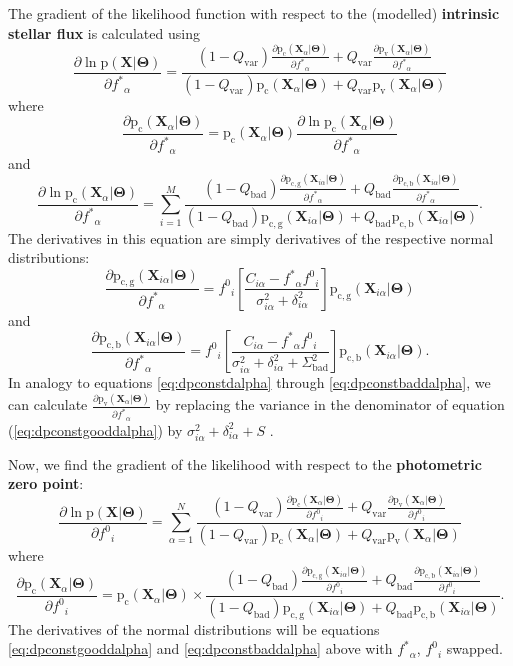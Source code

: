 \documentclass[12pt,preprint]{aastex}
\newcommand{\eqlabel}[1]{\label{eq:#1}}
\renewcommand{\eqref}[1]{\ref{eq:#1}}
\newcommand{\eq}[1]{equation (\eqref{#1})}
\newcommand{\paramvector}[1]{\boldsymbol{#1}}
\newcommand{\grad}[2]{\frac{\partial #1}{\partial #2}}
\renewcommand{\Pr}{\mathrm{p}}
\newcommand{\model}     {\ensuremath{\paramvector{\Theta}} }
\newcommand{\data}      {\ensuremath{\mathbf{X}} }
\newcommand{\X}         {\ensuremath{\mathbf{X}} }
\newcommand{\fstar}     {\ensuremath{f^*} }
\newcommand{\fzero}     {\ensuremath{f^0}}
\newcommand{\jitter}[1] {\ensuremath{\delta_{#1}^2} }
\newcommand{\Stot}      {\ensuremath{\sigma_{i\alpha}^2 + \jitter{i\alpha}} }
\newcommand{\Sbad}      {\ensuremath{\Sigma_\mathrm{bad}^2} }
\newcommand{\Sbadtot}   {\ensuremath{\sigma_{i\alpha}^2 + \jitter{i\alpha} + \Sbad} }
\newcommand{\Qbad}      {\ensuremath{Q_\mathrm{bad}} }
\newcommand{\Qvar}      {\ensuremath{Q_\mathrm{var}} }
\newcommand{\Svar}      {\ensuremath{S} }
\newcommand{\Svartot}   {\ensuremath{\sigma_{i\alpha}^2 + \jitter{i\alpha} + \Svar} }
\newcommand{\pconst}    {\ensuremath{\Pr_\mathrm{c} (\X_\alpha | \model) }}
\newcommand{\pvar}      {\ensuremath{\Pr_\mathrm{v} (\X_\alpha | \model) }}
\newcommand{\pconstbad} {\ensuremath{\Pr_\mathrm{c,b} (\X_{i\alpha} | \model)} }
\newcommand{\pconstgood}{\ensuremath{\Pr_\mathrm{c,g} (\X_{i\alpha} | \model)} }
\begin{document}
The gradient of the likelihood function with respect to the (modelled)
{\bf intrinsic stellar flux} is calculated using
\begin{equation}
    \grad{\ln \Pr (\data | \model)}{\fstar_\alpha} =
        \frac{(1-\Qvar)\grad{\pconst}{\fstar_\alpha} + \Qvar \grad{\pvar}{\fstar_\alpha}}
            { (1-\Qvar)\pconst + \Qvar\pvar}
\end{equation}
where
\begin{equation} \eqlabel{dpconstdalpha}
    \grad{\pconst}{\fstar_\alpha} = \pconst \grad{\ln \pconst}{\fstar_\alpha}
\end{equation}
and
\begin{equation}
    \grad{\ln \pconst}{\fstar_\alpha} =
        \sum_{i = 1}^{M}
            \frac{(1-\Qbad)\grad{\pconstgood}{\fstar_\alpha}
                + \Qbad \grad{\pconstbad}{\fstar_\alpha}}{ (1-\Qbad)
            \pconstgood  + \Qbad
            \pconstbad}.
\end{equation}
The derivatives in this equation are simply derivatives of the respective normal
distributions:
\begin{equation} \eqlabel{dpconstgooddalpha}
    \grad{\pconstgood}{\fstar_\alpha} = \fzero_i \left [
        \frac{C_{i\alpha} - \fstar_\alpha \fzero_i}{\Stot} \right ]
        \pconstgood
\end{equation}
and
\begin{equation} \eqlabel{dpconstbaddalpha}
    \grad{\pconstbad}{\fstar_\alpha} = \fzero_i \left [
        \frac{C_{i\alpha} - \fstar_\alpha \fzero_i}{\Sbadtot} \right ]
        \pconstbad.
\end{equation}
In analogy to equations \eqref{dpconstdalpha} through \eqref{dpconstbaddalpha},
we can calculate $\grad{\pvar}{\fstar_\alpha}$ by replacing the variance in the
denominator of \eq{dpconstgooddalpha} by \Svartot.

Now, we find the gradient of the likelihood with respect to the {\bf photometric
zero point}:
\begin{equation}
    \grad{\ln \Pr (\data | \model)}{\fzero_i} = \sum_{\alpha=1}^{N}
        \frac{(1-\Qvar)\grad{\pconst}{\fzero_i} + \Qvar \grad{\pvar}{\fzero_i}}
            { (1-\Qvar)\pconst + \Qvar\pvar}
\end{equation}
where
\begin{equation}
    \grad{\pconst}{\fzero_i} = \pconst \times
            \frac{(1-\Qbad)\grad{\pconstgood}{\fzero_i}
                + \Qbad \grad{\pconstbad}{\fzero_i}}{ (1-\Qbad)
            \pconstgood  + \Qbad
            \pconstbad}.
\end{equation}
The derivatives of the normal distributions will be equations \eqref{dpconstgooddalpha}
and \eqref{dpconstbaddalpha} above with $\fstar_\alpha$, $\fzero_i$ swapped.
\end{document}
